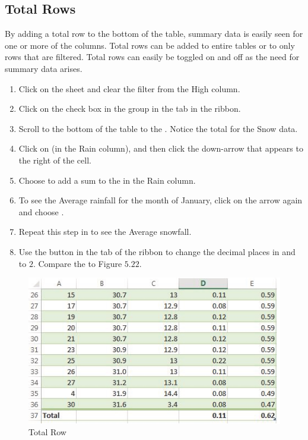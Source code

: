 \subsection{Total Rows}

By adding a total row to the bottom of the table, summary data is easily seen for one or more of the columns. Total rows can be added to entire tables or to only rows that are filtered. Total rows can easily be toggled on and off as the need for summary data arises.

\begin{enumerate}
	\item Click on the  sheet and clear the filter from the High column.
	\item Click on the  check box in the  group in the  tab in the ribbon.
	\item Scroll to the bottom of the table to the . Notice the total for the Snow data.
	\item Click on  (in the Rain column), and then click the down-arrow that appears to the right of the cell.
	\item Choose  to add a sum to the  in the Rain column.
	\item To see the Average rainfall for the month of January, click on the arrow again and choose .
	\item Repeat this step in  to see the Average snowfall.
	\item Use the  button in the  tab of the ribbon to change the decimal places in  and  to $ 2 $. Compare the  to Figure $ 5.22 $.
\end{enumerate}

\begin{figure}[H]
	\centering
	\includegraphics[width=\maxwidth{.95\linewidth}]{gfx/ch05_fig22}
	\caption{Total Row}
	\label{05:fig22}
\end{figure}

